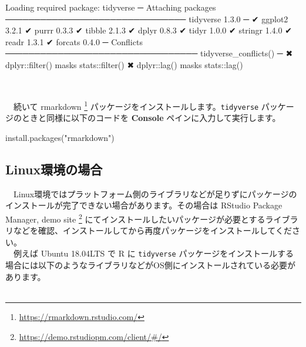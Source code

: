 \documentclass[
  12pt,
]{book}
\newenvironment{Shaded}{\begin{snugshade}}{\end{snugshade}}
\newcommand{\DecValTok}[1]{\textcolor[rgb]{0.00,0.00,0.81}{#1}}
\newcommand{\FloatTok}[1]{\textcolor[rgb]{0.00,0.00,0.81}{#1}}
\newcommand{\FunctionTok}[1]{\textcolor[rgb]{0.00,0.00,0.00}{#1}}
\newcommand{\NormalTok}[1]{#1}
\newcommand{\SpecialCharTok}[1]{\textcolor[rgb]{0.00,0.00,0.00}{#1}}
\newcommand{\StringTok}[1]{\textcolor[rgb]{0.31,0.60,0.02}{#1}}
\DeclareRobustCommand{\href}[2]{#2\footnote{\url{#1}}}
\begin{document}
\begin{Shaded}
\begin{Highlighting}[]
\NormalTok{Loading required package}\SpecialCharTok{:}\NormalTok{ tidyverse}
\NormalTok{─ Attaching packages ─────────────────────────────── tidyverse }\DecValTok{1}\NormalTok{.}\FloatTok{3.0}\NormalTok{ ─}
\NormalTok{✔ ggplot2 }\DecValTok{3}\NormalTok{.}\FloatTok{2.1}\NormalTok{     ✔ purrr   }\DecValTok{0}\NormalTok{.}\FloatTok{3.3}
\NormalTok{✔ tibble  }\DecValTok{2}\NormalTok{.}\FloatTok{1.3}\NormalTok{     ✔ dplyr   }\DecValTok{0}\NormalTok{.}\FloatTok{8.3}
\NormalTok{✔ tidyr   }\DecValTok{1}\NormalTok{.}\FloatTok{0.0}\NormalTok{     ✔ stringr }\DecValTok{1}\NormalTok{.}\FloatTok{4.0}
\NormalTok{✔ readr   }\DecValTok{1}\NormalTok{.}\FloatTok{3.1}\NormalTok{     ✔ forcats }\DecValTok{0}\NormalTok{.}\FloatTok{4.0}
\NormalTok{─ Conflicts ───────────────────────────────── }\FunctionTok{tidyverse\_conflicts}\NormalTok{() ─}
\NormalTok{✖ dplyr}\SpecialCharTok{::}\FunctionTok{filter}\NormalTok{() masks stats}\SpecialCharTok{::}\FunctionTok{filter}\NormalTok{()}
\NormalTok{✖ dplyr}\SpecialCharTok{::}\FunctionTok{lag}\NormalTok{()    masks stats}\SpecialCharTok{::}\FunctionTok{lag}\NormalTok{()}
\end{Highlighting}
\end{Shaded}

　

　続いて \href{https://rmarkdown.rstudio.com/}{rmarkdown } パッケージをインストールします。\texttt{tidyverse} パッケージのときと同様に以下のコードを \textbf{Console} ペインに入力して実行します。

\begin{Shaded}
\begin{Highlighting}[]
\FunctionTok{install.packages}\NormalTok{(}\StringTok{"rmarkdown"}\NormalTok{)}
\end{Highlighting}
\end{Shaded}

\hypertarget{linuxux74b0ux5883ux306eux5834ux5408}{%
\subsection{Linux環境の場合}\label{linuxux74b0ux5883ux306eux5834ux5408}}

　Linux環境ではプラットフォーム側のライブラリなどが足りずにパッケージのインストールが完了できない場合があります。その場合は \href{https://demo.rstudiopm.com/client/\#/}{RStudio Package Manager, demo site } にてインストールしたいパッケージが必要とするライブラリなどを確認、インストールしてから再度パッケージをインストールしてください。\\
　例えば Ubuntu 18.04LTS で R に \texttt{tidyverse} パッケージをインストールする場合には以下のようなライブラリなどがOS側にインストールされている必要があります。\\
　
\end{document}
